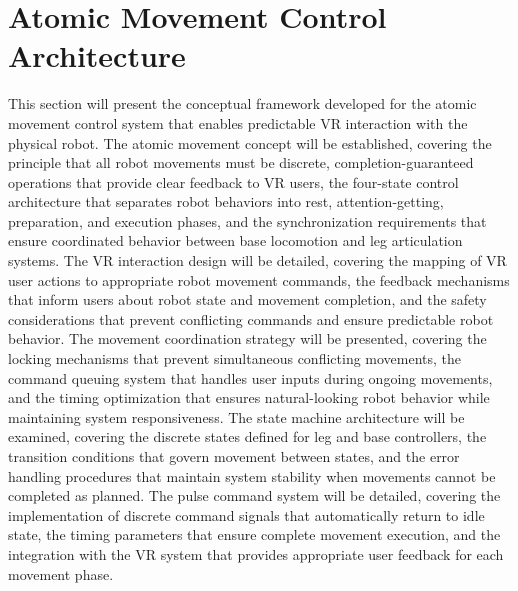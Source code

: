 \section{Atomic Movement Control Architecture}
This section will present the conceptual framework developed for the atomic movement control system that enables predictable VR interaction with the physical robot. The atomic movement concept will be established, covering the principle that all robot movements must be discrete, completion-guaranteed operations that provide clear feedback to VR users, the four-state control architecture that separates robot behaviors into rest, attention-getting, preparation, and execution phases, and the synchronization requirements that ensure coordinated behavior between base locomotion and leg articulation systems. The VR interaction design will be detailed, covering the mapping of VR user actions to appropriate robot movement commands, the feedback mechanisms that inform users about robot state and movement completion, and the safety considerations that prevent conflicting commands and ensure predictable robot behavior. The movement coordination strategy will be presented, covering the locking mechanisms that prevent simultaneous conflicting movements, the command queuing system that handles user inputs during ongoing movements, and the timing optimization that ensures natural-looking robot behavior while maintaining system responsiveness. The state machine architecture will be examined, covering the discrete states defined for leg and base controllers, the transition conditions that govern movement between states, and the error handling procedures that maintain system stability when movements cannot be completed as planned. The pulse command system will be detailed, covering the implementation of discrete command signals that automatically return to idle state, the timing parameters that ensure complete movement execution, and the integration with the VR system that provides appropriate user feedback for each movement phase.

